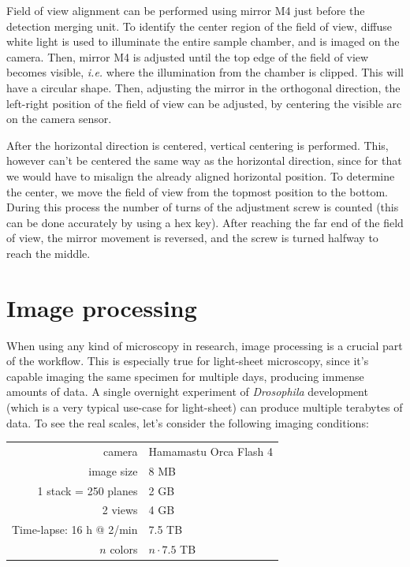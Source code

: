 \documentclass{diploma_style}
\begin{document}
Field of view alignment can be performed using mirror M4 just before the detection merging unit. To identify the center region of the field of view, diffuse white light is used to illuminate the entire sample chamber, and is imaged on the camera. Then, mirror M4 is adjusted until the top edge of the field of view becomes visible, \textit{i.e.} where the illumination from the chamber is clipped. This will have a circular shape. Then, adjusting the mirror in the orthogonal direction, the left-right position of the field of view can be adjusted, by centering the visible arc on the camera sensor.

After the horizontal direction is centered, vertical centering is performed. This, however can't be centered the same way as the horizontal direction, since for that we would have to misalign the already aligned horizontal position. To determine the center, we move the field of view from the topmost position to the bottom. During this process the number of  turns of the adjustment screw is counted (this can be done accurately by using a hex key). After reaching the far end of the field of view, the mirror movement is reversed, and the screw is turned halfway to reach the middle.





\chapter{Image processing}

When using any kind of microscopy in research, image processing is a crucial part of the workflow. This is especially true for light-sheet microscopy, since it's capable imaging the same specimen for multiple days, producing immense amounts of data. A single overnight experiment of \textit{Drosophila} development (which is a very typical use-case for light-sheet) can produce multiple terabytes of data. To see the real scales, let's consider the following imaging conditions:
\begin{center}
\begin{tabular}{rl}
    camera & Hamamastu Orca Flash 4 \\
    image size & 8 MB \\
    1 stack = 250 planes & 2 GB \\
    2 views & 4 GB \\
    Time-lapse: 16 h @ 2/min & 7.5 TB \\
    $n$ colors & $n\cdot 7.5$ TB
\end{tabular}
\end{center}
\end{document}
